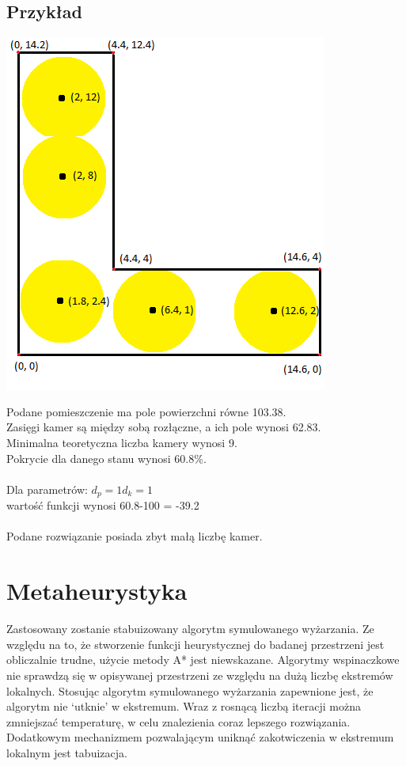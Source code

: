 \documentclass[12pt,a4paper]{article}
\begin{document}
\subsection{Przykład}
\begin{center}
\includegraphics[scale=0.9]{example_projection.png}
\end{center}
Podane pomieszczenie ma pole powierzchni równe 103.38. \\
Zasięgi kamer są między sobą rozłączne, a ich pole wynosi 62.83. \\
Minimalna teoretyczna liczba kamery wynosi 9. \\
Pokrycie dla danego stanu wynosi 60.8\%. \\ \\
Dla parametrów:
$d_p = 1 d_k = 1$ \\
wartość funkcji wynosi 60.8-100 = -39.2 \\ \\
Podane rozwiązanie posiada zbyt małą liczbę kamer.
\section{Metaheurystyka}
Zastosowany zostanie stabuizowany algorytm symulowanego wyżarzania.
Ze względu na to, że stworzenie funkcji heurystycznej do badanej przestrzeni jest obliczalnie
trudne, użycie metody A* jest niewskazane.
Algorytmy wspinaczkowe nie sprawdzą się w opisywanej przestrzeni ze względu na dużą liczbę
ekstremów lokalnych. Stosując algorytm symulowanego wyżarzania zapewnione jest,
że algorytm nie ‘utknie’ w ekstremum. Wraz z rosnącą liczbą iteracji można zmniejszać temperaturę,
w celu znalezienia coraz lepszego rozwiązania. Dodatkowym mechanizmem pozwalającym uniknąć
zakotwiczenia w ekstremum lokalnym jest tabuizacja.
\end{document}
